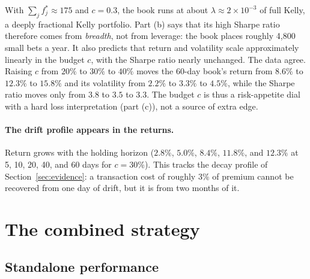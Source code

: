 \documentclass[11pt]{article}
\theoremstyle{definition}
\newcommand{\1}{\mathbf{1}}
\begin{document}
With $\sum_jf^\ast_j\approx175$ and $c=0.3$, the book runs at about $\lambda\approx2\times10^{-3}$
of full Kelly, a deeply fractional Kelly portfolio. Part (b) says that its high Sharpe ratio
therefore comes from \emph{breadth}, not from leverage: the book places roughly 4{,}800
small bets a year. It also predicts that return and volatility scale approximately linearly
in the budget $c$, with the Sharpe ratio nearly unchanged. The data agree. Raising $c$ from
$20\%$ to $30\%$ to $40\%$ moves the 60-day book's return from $8.6\%$ to $12.3\%$ to $15.8\%$ and
its volatility from $2.2\%$ to $3.3\%$ to $4.5\%$, while the Sharpe ratio moves only from $3.8$
to $3.5$ to $3.3$. The budget $c$ is thus a risk-appetite dial with a hard loss interpretation
(part (c)), not a source of extra edge.

\paragraph{The drift profile appears in the returns.} Return grows with the holding horizon
($2.8\%$, $5.0\%$, $8.4\%$, $11.8\%$, and $12.3\%$ at 5, 10, 20, 40, and 60 days for $c=30\%$). This
tracks the decay profile of Section~\ref{sec:evidence}: a transaction cost of roughly 3\% of
premium cannot be recovered from one day of drift, but it is from two months of it.

\section{The combined strategy}\label{sec:combined}

\subsection{Standalone performance}
\end{document}
